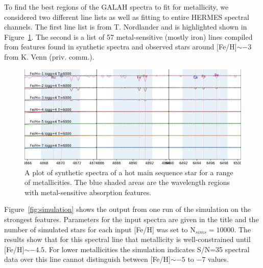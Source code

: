 \documentclass[]{aastex631}
\newcommand{\feh}{[Fe/H]\xspace}
\begin{document}
To find the best regions of the GALAH spectra to fit for metallicity, we considered two different line lists as well as fitting to entire HERMES spectral channels. The first line list is from T. Nordlander and is highlighted shown in Figure~\ref{fig:thomas_synthetic}. The second is a list of 57 metal-sensitive (mostly iron) lines compiled from features found in synthetic spectra and observed stars around \feh$\sim-3$ from K. Venn (priv. comm.).

\begin{figure}
\includegraphics[width=\linewidth]{Plots/sim_plots/plot_thomas_regions_synthetic.jpg}
\caption{A plot of synthetic spectra of a hot main sequence star for a range of metallicities. The blue shaded areas are the wavelength regions with metal-sensitive absorption features.}
\label{fig:thomas_synthetic}
\end{figure}

Figure~\ref{fig:simulation} shows the output from one run of the simulation on the strongest features. Parameters for the input spectra are given in the title and the number of simulated stars for each input \feh was set to N$_{sims}=10000$. The results show that for this spectral line that metallicity is well-constrained until \feh $\sim-4.5$. For lower metallicities the simulation indicates S/N=35 spectral data over this line cannot distinguish between \feh $\sim-5$ to $-7$ values.
\end{document}
